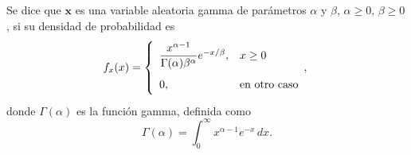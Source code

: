 \documentclass[a4paper]{report}
\newcommand{\x}{\mathbf{x}}
\begin{document}
Se dice que \(\x\) es una variable aleatoria gamma de parámetros \(\alpha\) y \(\beta\), \(\alpha\geq 0,\,\beta\geq 0\), si su densidad de probabilidad es
\begin{equation}\label{eq:pdf_gamma}
\def\arraystretch{2.0}
 f_x(x)=
 \left\{\begin{array}{ll}
  \dfrac{x^{\alpha-1}}{\Gamma(\alpha)\beta^\alpha} e^{-x/\beta}, & x\geq 0\\
  0, & \textrm{en otro caso}
 \end{array}, \right.
\end{equation}
donde \(\Gamma(\alpha)\) es la función gamma, definida como
\begin{equation}\label{eq:gamma_function}
 \Gamma(\alpha)=\int_{0}^{\infty}x^{\alpha-1}e^{-x}\,dx.
\end{equation}
\end{document}

